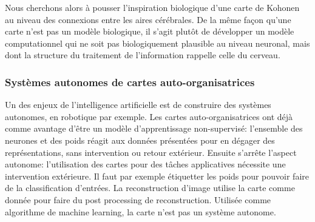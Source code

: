 \documentclass[../main]{subfiles}
\begin{document}
Nous cherchons alors à pousser l'inspiration biologique d'une carte de Kohonen au niveau des connexions entre les aires cérébrales. De la même façon qu'une carte n'est pas un modèle biologique, il s'agit plutôt de développer un modèle computationnel qui ne soit pas biologiquement plausible au niveau neuronal, mais dont la structure du traitement de l'information rappelle celle du cerveau. 




\subsubsection{Systèmes autonomes de cartes auto-organisatrices}

Un des enjeux de l'intelligence artificielle est de construire des systèmes autonomes, en robotique par exemple.
Les cartes auto-organisatrices ont déjà comme avantage d'être un modèle d'apprentissage non-supervisé: l'ensemble des neurones et des poids réagit aux données présentées pour en dégager des représentations, sans intervention ou retour extérieur. 
Ensuite s'arrête l'aspect autonome: l'utilisation des cartes pour des tâches applicatives nécessite une intervention extérieure.
 Il faut par exemple étiquetter les poids pour pouvoir faire de la classification d'entrées. 
 La reconstruction d'image utilise la carte comme donnée pour faire du post processing de reconstruction. Utilisée comme algorithme de machine learning, la carte n'est pas un système autonome. 
\end{document}
